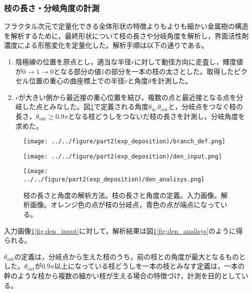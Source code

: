\documentclass[autodetect-engine,dvi=dvipdfmx,a4paper,ja=standard,oneside,openany,11pt,draft]{bxjsbook}
\begin{document}
\begin{enumerate}
\subsubsection{枝の長さ・分岐角度の計測}
フラクタル次元で定量化できる全体形状の特徴よりもよりも細かい金属樹の構造を解析するために，最終形状について枝の長さや分岐角度を解析し，界面活性剤濃度による形態変化を定量化した。解析手順は以下の通りである。
\begin{enumerate}
  \item 陰極線の位置を原点とし，適当な半径$r$に対して動径方向に走査し，輝度値が$0\rightarrow1\rightarrow0$となる部分の値1の部分を一本の枝の太さとした。取得したピクセル位置の重心の曲座標上での半径$r$と角度$\theta$を計測した。
  \item $r$が大きい側から最近接の重心位置を結び，複数の点と最近接となる点を分岐した点とみなした。図\ref{fig:branch_def_input}で定義される角度$\theta_{\mathrm{in}}$,$\theta_{\mathrm{out}}$と，分岐点をつなぐ枝の長さ，$\theta_{\mathrm{out}}\geq 0.9\pi$となる枝どうしをつないだ枝の長さを計測し，分岐角度を求めた。
\end{enumerate}
\begin{figure}
  \begin{minipage}
    {0.32\textwidth}
    \subcaption{}
    \centering
    \texttt{[image: ../../figure/part2(exp\_deposition)/branch\_def.png]}
    \label{fig:branch_def}
  \end{minipage}
  \begin{minipage}
    {0.32\textwidth}
    \subcaption{}
    \centering
    \texttt{[image: ../../figure/part2(exp\_deposition)/den\_input.png]}
    \label{fig:den_input}
  \end{minipage}
  \begin{minipage}
    {0.32\textwidth}
    \subcaption{}
    \centering
    \texttt{[image: ../../figure/part2(exp\_deposition)/den\_analisys.png]}
    \label{fig:den_analisys}
  \end{minipage}
  \label{fig:branch_def_input}
  \caption{枝の長さと角度の解析方法。枝の長さと角度の定義。入力画像。解析画像。オレンジ色の点が枝の分岐点，青色の点が端点になっている。}
\end{figure}
入力画像\ref{fig:branch_def_input}\ref{fig:den_input}に対して，解析結果は図\ref{fig:branch_def_input}\ref{fig:den_analisys}のように得られる。

$\theta_{\mathrm{out}}$の定義は，分岐点から生えた枝のうち，前の枝との角度が最大となるものとした。$\theta_{\mathrm{out}}$が$0.9\pi$以上になっている枝どうしを一本の枝とみなす定義は，一本の幹のような枝から複数の細かい枝が生える場合の特徴づけ，計測を目的としている。

\end{enumerate}
\end{document}
